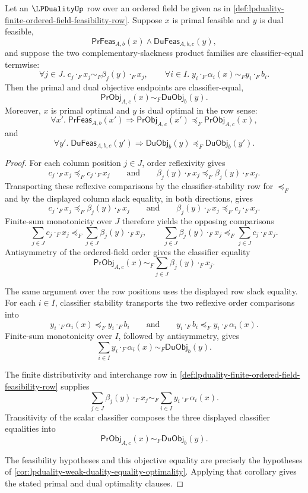 \begin{theorem}
\label{thm:lpduality-complementary-slackness-objective-equality}
Let an $\LPDualityUp$ row over an ordered field be given as in \autoref{def:lpduality-finite-ordered-field-feasibility-row}. Suppose $x$ is primal feasible and $y$ is dual feasible,
$$
\mathsf{PrFeas}_{A,b}(x)\land\mathsf{DuFeas}_{A,b,c}(y),
$$
and suppose the two complementary-slackness product families are classifier-equal termwise:
$$
\forall j\in J.\; c_j\cdot_Fx_j\sim_F\beta_j(y)\cdot_Fx_j,
\qquad
\forall i\in I.\; y_i\cdot_F\alpha_i(x)\sim_Fy_i\cdot_Fb_i.
$$
Then the primal and dual objective endpoints are classifier-equal,
$$
\mathsf{PrObj}_{A,c}(x)\sim_F\mathsf{DuObj}_{b}(y).
$$
Moreover, $x$ is primal optimal and $y$ is dual optimal in the row sense:
$$
\forall x'.\;\mathsf{PrFeas}_{A,b}(x')
\Longrightarrow
\mathsf{PrObj}_{A,c}(x')\preceq_F\mathsf{PrObj}_{A,c}(x),
$$
and
$$
\forall y'.\;\mathsf{DuFeas}_{A,b,c}(y')
\Longrightarrow
\mathsf{DuObj}_{b}(y)\preceq_F\mathsf{DuObj}_{b}(y').
$$
\end{theorem}
\begin{proof}
For each column position $j\in J$, order reflexivity gives
$$
c_j\cdot_Fx_j\preceq_Fc_j\cdot_Fx_j
\qquad\text{and}\qquad
\beta_j(y)\cdot_Fx_j\preceq_F\beta_j(y)\cdot_Fx_j.
$$
Transporting these reflexive comparisons by the classifier-stability row for $\preceq_F$ and by the displayed column slack equality, in both directions, gives
$$
c_j\cdot_Fx_j\preceq_F\beta_j(y)\cdot_Fx_j
\qquad\text{and}\qquad
\beta_j(y)\cdot_Fx_j\preceq_Fc_j\cdot_Fx_j.
$$
Finite-sum monotonicity over $J$ therefore yields the opposing comparisons
$$
\sum_{j\in J}c_j\cdot_Fx_j
\preceq_F
\sum_{j\in J}\beta_j(y)\cdot_Fx_j,
\qquad
\sum_{j\in J}\beta_j(y)\cdot_Fx_j
\preceq_F
\sum_{j\in J}c_j\cdot_Fx_j.
$$
Antisymmetry of the ordered-field order gives the classifier equality
$$
\mathsf{PrObj}_{A,c}(x)
\sim_F
\sum_{j\in J}\beta_j(y)\cdot_Fx_j.
$$

The same argument over the row positions uses the displayed row slack equality. For each $i\in I$, classifier stability transports the two reflexive order comparisons into
$$
y_i\cdot_F\alpha_i(x)\preceq_Fy_i\cdot_Fb_i
\qquad\text{and}\qquad
y_i\cdot_Fb_i\preceq_Fy_i\cdot_F\alpha_i(x).
$$
Finite-sum monotonicity over $I$, followed by antisymmetry, gives
$$
\sum_{i\in I}y_i\cdot_F\alpha_i(x)
\sim_F
\mathsf{DuObj}_{b}(y).
$$

The finite distributivity and interchange row in \autoref{def:lpduality-finite-ordered-field-feasibility-row} supplies
$$
\sum_{j\in J}\beta_j(y)\cdot_Fx_j
\sim_F
\sum_{i\in I}y_i\cdot_F\alpha_i(x).
$$
Transitivity of the scalar classifier composes the three displayed classifier equalities into
$$
\mathsf{PrObj}_{A,c}(x)\sim_F\mathsf{DuObj}_{b}(y).
$$

The feasibility hypotheses and this objective equality are precisely the hypotheses of \autoref{cor:lpduality-weak-duality-equality-optimality}. Applying that corollary gives the stated primal and dual optimality clauses.
\end{proof}

